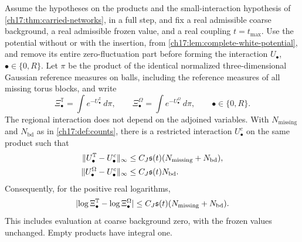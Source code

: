 \begin{lemma}\label{ch17:lem:real-cut-integral}
Assume the hypotheses on the products and the small-interaction hypothesis of \cref{ch17:thm:carried-networks}, in a full step, and fix a real admissible coarse background, a real admissible frozen value, and a real coupling $t=t_{\max}$. Use the potential without or with the insertion, from \cref{ch17:lem:complete-white-potential}, and remove its entire zero-fluctuation part before forming the interaction $U_\bullet$, $\bullet\in\{0,R\}$. Let $\pi$ be the product of the identical normalized three-dimensional Gaussian reference measures on balls, including the reference measures of all missing torus blocks, and write
\[
 \Xi_\bullet^{\mathbb T}=\int e^{-U_\bullet^{\mathbb T}}\,d\pi,\qquad\Xi_\bullet^\Omega=\int e^{-U_\bullet^\Omega}\,d\pi,\qquad\bullet\in\{0,R\}.
\]
The regional interaction does not depend on the adjoined variables. With $N_{\mathrm{missing}}$ and $N_{\mathrm{bd}}$ as in \cref{ch17:def:counts}, there is a restricted interaction $U_\bullet^c$ on the same product such that
\begin{align*}
 \lVert U_\bullet^{\mathbb T}-U_\bullet^c\rVert_\infty&\le C_J\mathfrak s(t)(N_{\mathrm{missing}}+N_{\mathrm{bd}}),\\
 \lVert U_\bullet^\Omega-U_\bullet^c\rVert_\infty&\le C_J\mathfrak s(t)N_{\mathrm{bd}}.
\end{align*}
Consequently, for the positive real logarithms,
\begin{equation}\label{ch17:eq:real-vacuum-comparison}
 \lvert \log\Xi_\bullet^{\mathbb T}-\log\Xi_\bullet^\Omega\rvert\le C_J\mathfrak s(t)(N_{\mathrm{missing}}+N_{\mathrm{bd}}).
\end{equation}
This includes evaluation at coarse background zero, with the frozen values unchanged. Empty products have integral one.
\end{lemma}

